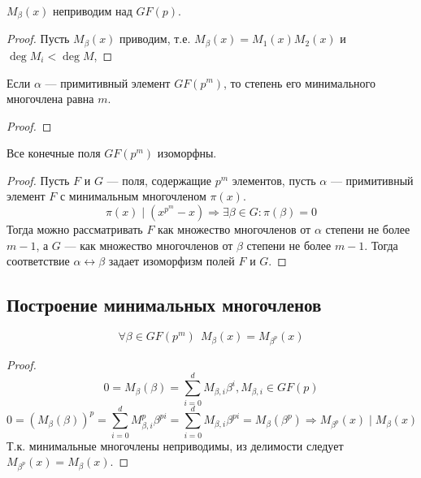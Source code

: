 \begin{theorem}
    \(M_\beta(x)\) неприводим над \(GF(p)\).
\end{theorem}
\begin{proof}
    Пусть \(M_\beta(x)\) приводим, т.е. \(M_\beta(x) = M_1(x)M_2(x)\) и \(\deg M_i < \deg M\), \unfinished
\end{proof}

\begin{theorem}
    \unfinished
\end{theorem}

\begin{theorem}
    \unfinished
\end{theorem}

\begin{theorem}
    Если \(\alpha\) --- примитивный элемент \(GF(p^m)\), то степень его минимального многочлена равна \(m\).
\end{theorem}
\begin{proof}
    \unfinished
\end{proof}

\begin{theorem}
    Все конечные поля \(GF(p^m)\) изоморфны.
\end{theorem}
\begin{proof}
    Пусть \(F\) и \(G\) --- поля, содержащие \(p^m\) элементов, пусть \(\alpha\)
    --- примитивный элемент \(F\) с минимальным многочленом \(\pi(x)\).
    \[\pi(x) \mid (x^{p^m} - x) \Rightarrow \exists \beta \in G : \pi(\beta) = 0\]
    Тогда можно рассматривать \(F\) как множество многочленов от \(\alpha\)
    степени не более \(m - 1\), а \(G\) --- как множество многочленов от
    \(\beta\) степени не более \(m - 1\).
    Тогда соответствие \(\alpha \leftrightarrow \beta\) задает изоморфизм
    полей \(F\) и \(G\).
\end{proof}

\unfinished

\subsection{Построение минимальных многочленов}

\begin{theorem}
    \[\forall \beta \in GF(p^m) \ \ M_{\beta}(x) = M_{\beta^{p}}(x)\]
\end{theorem}
\begin{proof}
    \[0 = M_\beta(\beta) = \sum_{i = 0}^d M_{\beta,i}\beta^i, M_{\beta,i} \in GF(p)\]
    \[0 = (M_\beta(\beta))^p = \sum_{i = 0}^d M_{\beta,i}^p \beta^{pi}
    = \sum_{i = 0}^d M_{\beta,i}\beta^{pi} = M_\beta(\beta^p) \Rightarrow
    M_{\beta^p}(x) \mid M_\beta(x)\]
    Т.к. минимальные многочлены неприводимы, из делимости следует
    \(M_{\beta^p}(x) = M_\beta(x)\).
\end{proof}

\unfinished